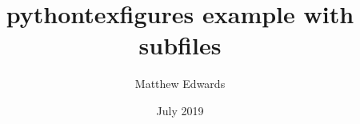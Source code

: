 \documentclass[12pt,a4paper]{article}
\begin{document}
    \title{pythontexfigures example with subfiles}
    \author{Matthew Edwards}
    \date{July 2019}
    \maketitle

    
    
\end{document}
